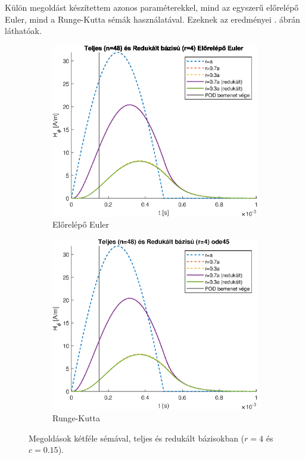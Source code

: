         \par
        Külön megoldást készítettem azonos paraméterekkel, mind az egyszerű előrelépő Euler, mind a Runge-Kutta sémák használatával. Ezeknek az eredményei . ábrán láthatóak.
        \begin{figure}[h]
            \centering
            \begin{subfigure}{0.48\textwidth}
                \includegraphics[width=\textwidth]{kep/euler_0.15_4_td.eps}
                \caption{Előrelépő Euler}
            \end{subfigure}
            \begin{subfigure}{0.48\textwidth}
                \includegraphics[width=\textwidth]{kep/ode45_0.15_4_td.eps}
                \caption{Runge-Kutta}
            \end{subfigure}
            \caption{Megoldások kétféle sémával, teljes és redukált bázisokban ($r=4$ és $c=0.15$).}
            \label{fig:sema}
        \end{figure}
